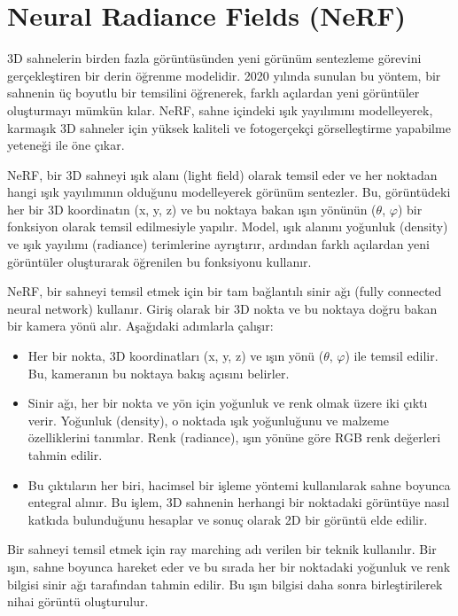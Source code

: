 \section{Neural Radiance Fields (NeRF)}

3D sahnelerin birden fazla görüntüsünden yeni görünüm sentezleme görevini gerçekleştiren bir derin öğrenme modelidir. 2020 yılında sunulan bu yöntem, bir sahnenin üç boyutlu bir temsilini öğrenerek, farklı açılardan yeni görüntüler oluşturmayı mümkün kılar. NeRF, sahne içindeki ışık yayılımını modelleyerek, karmaşık 3D sahneler için yüksek kaliteli ve fotogerçekçi görselleştirme yapabilme yeteneği ile öne çıkar.

NeRF, bir 3D sahneyi ışık alanı (light field) olarak temsil eder ve her noktadan hangi ışık yayılımının olduğunu modelleyerek görünüm sentezler. Bu, görüntüdeki her bir 3D koordinatın (x, y, z) ve bu noktaya bakan ışın yönünün ($\theta$, $\varphi$) bir fonksiyon olarak temsil edilmesiyle yapılır. Model, ışık alanını yoğunluk (density) ve ışık yayılımı (radiance) terimlerine ayrıştırır, ardından farklı açılardan yeni görüntüler oluşturarak öğrenilen bu fonksiyonu kullanır.

NeRF, bir sahneyi temsil etmek için bir tam bağlantılı sinir ağı (fully connected neural network) kullanır. Giriş olarak bir 3D nokta ve bu noktaya doğru bakan bir kamera yönü alır. Aşağıdaki adımlarla çalışır:

\begin{itemize}
    \item Her bir nokta, 3D koordinatları (x, y, z) ve ışın yönü ($\theta$, $\varphi$) ile temsil edilir. Bu, kameranın bu noktaya bakış açısını belirler.
    \item Sinir ağı, her bir nokta ve yön için yoğunluk ve renk olmak üzere iki çıktı verir. Yoğunluk (density), o noktada ışık yoğunluğunu ve malzeme özelliklerini tanımlar. Renk (radiance), ışın yönüne göre RGB renk değerleri tahmin edilir.
    \item  Bu çıktıların her biri, hacimsel bir işleme yöntemi kullanılarak sahne boyunca entegral alınır. Bu işlem, 3D sahnenin herhangi bir noktadaki görüntüye nasıl katkıda bulunduğunu hesaplar ve sonuç olarak 2D bir görüntü elde edilir.

\end{itemize}

Bir sahneyi temsil etmek için ray marching adı verilen bir teknik kullanılır. Bir ışın, sahne boyunca hareket eder ve bu sırada her bir noktadaki yoğunluk ve renk bilgisi sinir ağı tarafından tahmin edilir. Bu ışın bilgisi daha sonra birleştirilerek nihai görüntü oluşturulur.


